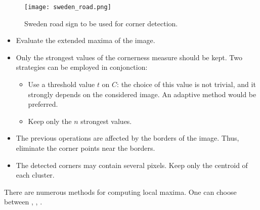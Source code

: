 \begin{figure}[H]
\centering\caption{Sweden road sign to be used for corner detection.}%
 \texttt{[image: sweden\_road.png]}%
 \label{fig:harrs:enonce:road_sign}%
\end{figure}



\begin{qbox}
 \begin{itemize}
 \item Evaluate the extended maxima of the image.
 \item Only the strongest values of the cornerness measure should be kept. Two strategies can be employed in conjonction:
 \begin{itemize}\item Use a threshold value $t$ on $C$: the choice of this value is not trivial, and it strongly depends on the considered image. An adaptive method would be preferred.
 \item Keep only the $n$ strongest values.
 \end{itemize}
  \item The previous operations are affected by the borders of the image. Thus, eliminate the corner points near the borders.
  \item The detected corners may contain several pixels. Keep only the centroid of each cluster.
  
 \end{itemize}

\end{qbox}

\begin{pcomment}
\begin{phelp}
 There are numerous methods for computing local maxima. One can choose between , , .
\end{phelp}

\end{pcomment}
